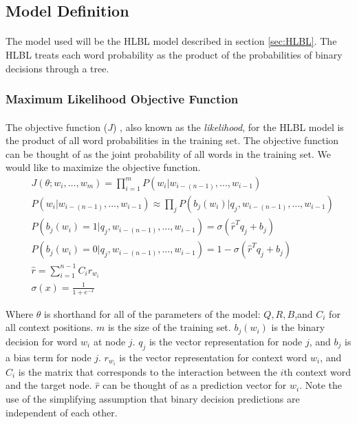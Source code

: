 \subsection{Model Definition}
\paragraph{}
The model used will be the HLBL model described in section \ref{sec:HLBL}. The HLBL treats each word probability as the product of the probabilities of binary decisions through a tree.

\subsubsection{Maximum Likelihood Objective Function}
\paragraph{}
The objective function ($J$) , also known as the \emph{likelihood}, for the HLBL model is the product of all word probabilities in the training set. The objective function can be thought of as the joint probability of all words in the training set. We would like to maximize the objective function. 
\begin{align}
&J(\theta;w_i,\dots, w_m) = \prod_{i=1}^{m} P(w_i | w_{i-(n-1)},\dots, w_{i-1})
\\
&P(w_i | w_{i-(n-1)},\dots, w_{i-1})  \approx \prod_j P(b_j(w_i) | q_j, w_{i-(n-1)},\dots, w_{i-1})
\\ 
&P(b_j(w_i) = 1 | q_j, w_{i-(n-1)},\dots, w_{i-1}) =  \sigma( \hat{r}^T q_{j} +b_{j}) \nonumber
\\ 
&P(b_j(w_i) = 0 | q_j, w_{i-(n-1)},\dots, w_{i-1}) =  1- \sigma( \hat{r}^T q_{j} +b_{j}) \nonumber
\\ 
&\hat{r} = \sum_{i=1}^{n-1} C_i r_{w_i} \nonumber
\\  
&\sigma(x) = \frac{1}{1+e^{-x}} \label{eq:sigmoid} \nonumber
\end{align}

Where $\theta$ is shorthand for all of the parameters of the model: $Q,R,B$,and $C_i$ for all context positions. $m$ is the size of the training set.  $b_j(w_i)$ is the binary decision for word $w_i$ at node $j$. $q_j$ is the vector representation for node $j$, and $b_{j}$ is a bias term for node $j$. $r_{w_i}$ is the vector representation for context word $w_i$, and $C_i$ is the matrix that corresponds to the interaction between the $i$th context word and the target node.  $\hat{r}$ can be thought of as a prediction vector for $w_i$. Note the use of the simplifying assumption that binary decision predictions are independent of each other.
